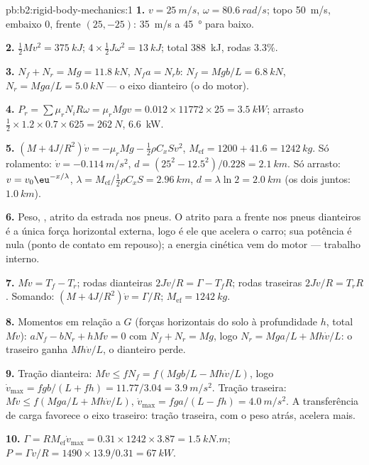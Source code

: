 \begin{solution}{pb:b2:rigid-body-mechanics:1}
\textbf{1.} $v = \qty{25}{m/s}$, $\omega = \qty{80.6}{rad/s}$; topo \qty{50}{m/s},
embaixo $0$, frente $(25, -25)$: \qty{35}{m/s} a \qty{45}{\degree} para baixo.

\textbf{2.} $\tfrac12Mv^2 = \qty{375}{kJ}$; $4 \times \tfrac12J\omega^2 = \qty{13}{kJ}$;
total \qty{388}{kJ}, rodas $3.3\%$.

\textbf{3.} $N_f + N_r = Mg = \qty{11.8}{kN}$, $N_fa = N_rb$: $N_f = Mgb/L =
\qty{6.8}{kN}$, $N_r = Mga/L = \qty{5.0}{kN}$ --- o eixo dianteiro (o do motor).

\textbf{4.} $P_r = \sum\mu_rN_iR\omega = \mu_rMgv = 0.012 \times 11772 \times 25 =
\qty{3.5}{kW}$; arrasto $\tfrac12 \times 1.2 \times 0.7 \times 625 = \qty{262}{N}$, \qty{6.6}{kW}.

\textbf{5.} $(M + 4J/R^2)\dot v = -\mu_rMg - \tfrac12\rho C_xSv^2$, $M_{\text{ef}} =
1200 + 41.6 = \qty{1242}{kg}$. Só rolamento: $\dot v = \qty{-0.114}{m/s^2}$,
$d = (25^2 - 12.5^2)/0.228 = \qty{2.1}{km}$. Só arrasto: $v = v_0\eu^{-x/\lambda}$,
$\lambda = M_{\text{ef}}/\tfrac12\rho C_xS = \qty{2.96}{km}$, $d = \lambda\ln2 =
\qty{2.0}{km}$ (os dois juntos: $\qty{1.0}{km}$).

\textbf{6.} Peso, , atrito da estrada nos pneus.
O atrito para a frente nos pneus dianteiros é a única força horizontal
externa, logo é ele que acelera o carro; sua potência é nula (ponto de contato em
repouso); a energia cinética vem do motor --- trabalho interno.

\textbf{7.} $M\dot v = T_f - T_r$; rodas dianteiras $2J\dot v/R = \Gamma - T_fR$;
rodas traseiras $2J\dot v/R = T_rR$. Somando: $(M + 4J/R^2)\dot v = \Gamma/R$;
$M_{\text{ef}} = \qty{1242}{kg}$.

\textbf{8.} Momentos em relação a $G$ (forças horizontais do solo à profundidade $h$,
total $M\dot v$): $aN_f - bN_r + hM\dot v = 0$ com $N_f + N_r = Mg$, logo
$N_r = Mga/L + Mh\dot v/L$: o traseiro ganha $Mh\dot v/L$, o dianteiro perde.

\textbf{9.} Tração dianteira: $M\dot v \le fN_f = f(Mgb/L - Mh\dot v/L)$, logo
$\dot v_{\max} = fgb/(L + fh) = 11.77/3.04 = \qty{3.9}{m/s^2}$. Tração traseira:
$M\dot v \le f(Mga/L + Mh\dot v/L)$, $\dot v_{\max} = fga/(L - fh) = \qty{4.0}{m/s^2}$.
A transferência de carga favorece o eixo traseiro: tração traseira, com o peso atrás,
acelera mais.

\textbf{10.} $\Gamma = RM_{\text{ef}}\dot v_{\max} = 0.31 \times 1242 \times 3.87 =
\qty{1.5}{kN.m}$; $P = \Gamma v/R = 1490 \times 13.9/0.31 = \qty{67}{kW}$.


\end{solution}
